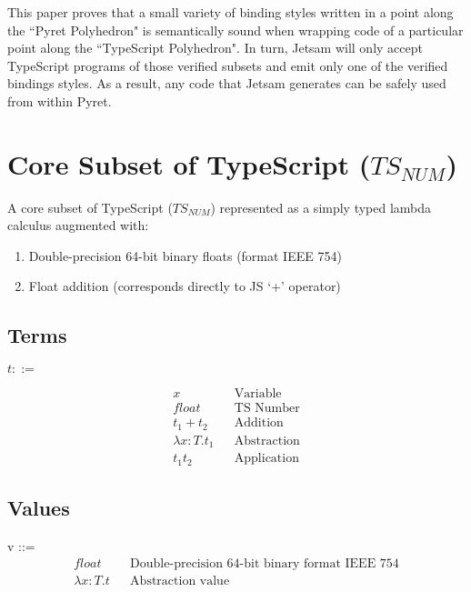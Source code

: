 \documentclass{article}
\begin{document}
	This paper proves that a small variety of binding styles written in a point along the ``Pyret Polyhedron" is semantically sound when wrapping code of a particular point along the ``TypeScript Polyhedron". In turn, Jetsam will only accept TypeScript programs of those verified subsets and emit only one of the verified bindings styles. As a result, any code that Jetsam generates can be safely used from within Pyret.\\

	\section{Core Subset of TypeScript ($TS_{NUM}$)}
	
	A core subset of TypeScript ($TS_{NUM}$) represented as a simply typed lambda calculus augmented with:
	\begin{enumerate}
		\item Double-precision 64-bit binary floats (format IEEE 754)
		\item Float addition (corresponds directly to JS `+' operator)
	\end{enumerate}
	
	\subsection{Terms}
	$t ::=$
	
	\begin{align*}
		x											&& \text{Variable}\\
		float  										&& \text{TS Number} \\
		t_1 + t_2 									&& \text{Addition} \\
		\lambda x\colon T.t_1						&& \text{Abstraction} \\
		t_1 t_2										&& \text{Application}
	\end{align*}


	\subsection{Values}
	v ::=
	\begin{align*}
		float										&& \text{Double-precision 64-bit binary format IEEE 754} \\
		\lambda x\colon T.t							&& \text{Abstraction value}
	\end{align*}
	
	
\end{document}
